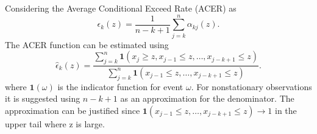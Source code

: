 Considering the Average Conditional Exceed Rate (ACER) as
\begin{equation}
\epsilon_k(z)=\frac{1}{n-k+1} \sum_{j=k}^{n} \alpha_{kj}(z).
\end{equation}
The ACER function can be estimated using
\begin{equation}
\label{eq:epsest}
\hat{\epsilon}_k(z)=\frac{\sum_{j=k}^n \mathbf{1}(x_{j} \geq z, x_{j-1} \leq z, \ldots, x_{j-k+1} \leq z)}{\sum_{j=k}^n \mathbf{1}(x_{j-1} \leq z, \ldots, x_{j-k+1} \leq z)}.
\end{equation}
where $\mathbf{1}(\omega)$ is the indicator function for event $\omega$. For nonstationary observations it is suggested using $n-k+1$ as an approximation for the denominator. The approximation can be justified since $ \mathbf{1}(x_{j-1} \leq z, \ldots, x_{j-k+1} \leq z) \to 1$ in the upper tail where z is large. 

